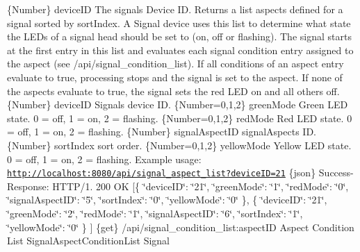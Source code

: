 \{Number\} device\+ID The signal\textquotesingle{}s Device ID.  Returns a list aspects defined for a signal sorted by sort\+Index. A Signal device uses this list to determine what state the L\+ED\textquotesingle{}s of a signal head should be set to (on, off or flashing). The signal starts at the first entry in this list and evaluates each signal condition entry assigned to the aspect (see /api/signal\+\_\+condition\+\_\+list). If all conditions of an aspect entry evaluate to true, processing stops and the signal is set to the aspect. If none of the aspects evaluate to true, the signal sets the red L\+ED on and all others off.  \{Number\} device\+ID Signal\textquotesingle{}s device ID.  \{Number=0,1,2\} green\+Mode Green L\+ED state. 0 = off, 1 = on, 2 = flashing.  \{Number=0,1,2\} red\+Mode Red L\+ED state. 0 = off, 1 = on, 2 = flashing.  \{Number\} signal\+Aspect\+ID signal\+Aspect\textquotesingle{}s ID.  \{Number\} sort\+Index sort order.  \{Number=0,1,2\} yellow\+Mode Yellow L\+ED state. 0 = off, 1 = on, 2 = flashing.  Example usage\+: \href{http://localhost:8080/api/signal_aspect_list?deviceID=21}{\tt http\+://localhost\+:8080/api/signal\+\_\+aspect\+\_\+list?device\+I\+D=21}  \{json\} Success-\/\+Response\+: H\+T\+T\+P/1. 200 OK \mbox{[}\{ \char`\"{}device\+I\+D\char`\"{}\+: \char`\"{}21\char`\"{}, \char`\"{}green\+Mode\char`\"{}\+: \char`\"{}1\char`\"{}, \char`\"{}red\+Mode\char`\"{}\+: \char`\"{}0\char`\"{}, \char`\"{}signal\+Aspect\+I\+D\char`\"{}\+: \char`\"{}5\char`\"{}, \char`\"{}sort\+Index\char`\"{}\+: \char`\"{}0\char`\"{}, \char`\"{}yellow\+Mode\char`\"{}\+: \char`\"{}0\char`\"{} \}, \{ \char`\"{}device\+I\+D\char`\"{}\+: \char`\"{}21\char`\"{}, \char`\"{}green\+Mode\char`\"{}\+: \char`\"{}2\char`\"{}, \char`\"{}red\+Mode\char`\"{}\+: \char`\"{}1\char`\"{}, \char`\"{}signal\+Aspect\+I\+D\char`\"{}\+: \char`\"{}6\char`\"{}, \char`\"{}sort\+Index\char`\"{}\+: \char`\"{}1\char`\"{}, \char`\"{}yellow\+Mode\char`\"{}\+: \char`\"{}0\char`\"{} \} \mbox{]}  \{get\} /api/signal\+\_\+condition\+\_\+list\+:aspect\+ID Aspect Condition List  Signal\+Aspect\+Condition\+List  Signal

